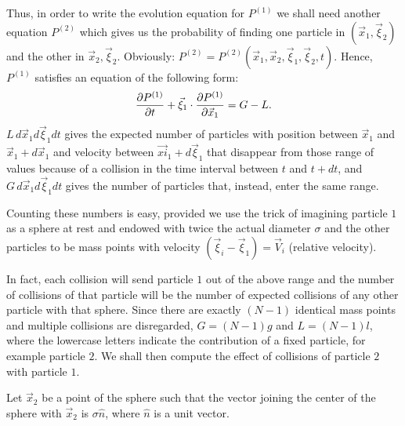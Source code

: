 Thus, in order to write the evolution equation for \(P^{(1)}\) we shall need another equation \(P^{(2)}\) which gives us the probability of finding one particle in \((\vec{x}_1, \vec{\xi}_2)\) and the other in \(\vec{x}_2, \vec{\xi}_2\). Obviously: \(P^{(2)} = P^{(2)}(\vec{x}_1, \vec{x}_2, \vec{\xi}_1, \vec{\xi}_2, t)\).
Hence, \(P^{(1)}\) satisfies an equation of the following form:
\begin{equation}
    \partialderivative{P^{(1)}}{t} + \vec{\xi}_1 \cdot \partialderivative{P^{(1)}}{\vec{x}_1} = G - L.
    \label{1.2.4}
\end{equation}\(L\,d\vec{x}_1 d \vec{\xi}_1 dt\) gives the expected number of particles with position between \(\vec{x}_1\) and \(\vec{x}_1 + d\vec{x}_1\) and velocity between \(\vec{xi}_1 + d\vec{\xi}_1\) that disappear from those range of values because of a collision in the time interval between \(t\) and \(t+dt\), and \(G\,d\vec{x}_1 d \vec{\xi}_1 dt\) gives the number of particles that, instead, enter the same range. 

Counting these numbers is easy, provided we use the trick of imagining particle \(1\) as a sphere at rest and endowed with twice the actual diameter \(\sigma\) and the other particles to be mass points with velocity \((\vec{\xi}_i - \vec{\xi}_1) = \vec{V}_i\) (relative velocity).



In fact, each collision will send particle \(1\) out of the above range and the number of collisions of that particle will be the number of expected collisions of any other particle with that sphere. Since there are exactly \((N-1)\) identical mass points and multiple collisions are disregarded, \(G = (N-1)g\) and \(L = (N-1)l\), where the lowercase letters indicate the contribution of a fixed particle, for example particle \(2\). We shall then compute the effect of collisions of particle \(2\) with particle \(1\). 

Let \(\vec{x}_2\) be a point of the sphere such that the vector joining the center of the sphere with \(\vec{x}_2\) is \(\sigma \hat{n}\), where \(\hat{n}\) is a unit vector. 